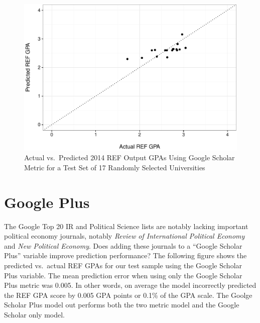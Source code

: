 \documentclass[]{article}
\begin{document}
\begin{figure}[htbp]
\centering
\includegraphics{README_files/figure-latex/unnamed-chunk-3-1.pdf}
\caption{Actual vs.~Predicted 2014 REF Output GPAs Using Google Scholar
Metric for a Test Set of 17 Randomly Selected Universities}
\end{figure}

\section{Google Plus}\label{google-plus}

The Google Top 20 IR and Political Science lists are notably lacking
important political economy journals, notably \emph{Review of
International Political Economy} and \emph{New Political Economy}. Does
adding these journals to a ``Google Scholar Plus'' variable improve
prediction performance? The following figure shows the predicted
vs.~actual REF GPAs for our test sample using the Google Scholar Plus
variable. The mean prediction error when using only the Google Scholar
Plus metric was 0.005. In other words, on average the model incorrectly
predicted the REF GPA score by 0.005 GPA points or 0.1\% of the GPA
scale. The Goolge Scholar Plus model out performs both the two metric
model and the Google Scholar only model.
\end{document}
